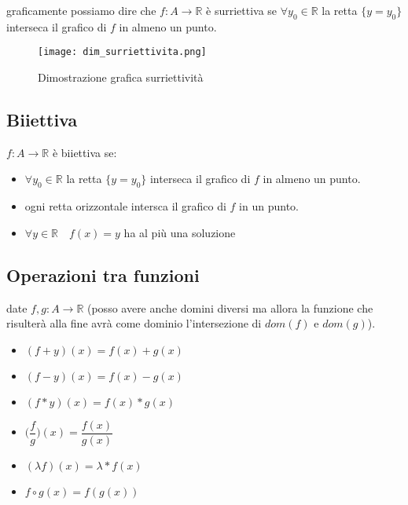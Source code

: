 \documentclass[../main.tex, class=article, 12pt]{subfiles}
\begin{document}
\begin{definition}
graficamente possiamo dire che $f : A \to \mathbb{R}$ è surriettiva se $ \forall y_0 \in \mathbb{R} $ la retta $ \{y = y_0\} $ interseca il grafico di $ f $ in almeno un punto.
\end{definition}

\begin{figure}[H]
  	\texttt{[image: dim\_surriettivita.png]}
  	\caption{Dimostrazione grafica surriettività}
        \label{fig:dim_surriettivita}
\end{figure}



\subsection{Biiettiva}\label{sec:biiettiva}
$ f : A \to \mathbb{R} $ è biiettiva se:
\begin{itemize}
        \item $ \forall y_0 \in \mathbb{R} $ la retta $ \{y = y_0\} $ interseca il grafico di $ f $ in almeno un punto.
        \item ogni retta orizzontale intersca il grafico di $ f $ in un punto. 
        \item $ \forall y \in \mathbb{R} \quad f(x) = y$ ha al più una soluzione
\end{itemize}




\newpage
\subsection{Operazioni tra funzioni}\label{sec:operazioni_tra_funzioni}
date $ f,g : A \to \mathbb{R} $ (posso avere anche domini diversi ma allora la funzione che risulterà alla fine avrà come dominio l'intersezione di $ dom(f) $ e $ dom(g) $).

\begin{itemize}
        \item $(f + y)(x) = f(x) + g(x)$
        \item $(f - y)(x) = f(x) - g(x)$
        \item $(f * y)(x) = f(x) * g(x)$
        \item $\Bigg(\dfrac{f}{g}\Bigg)(x) = \dfrac{f(x)}{g(x)}$
        \item $(\lambda f)(x) = \lambda * f(x)$
        \item $ f \circ g (x) = f(g(x))$
\end{itemize}
\end{document}
